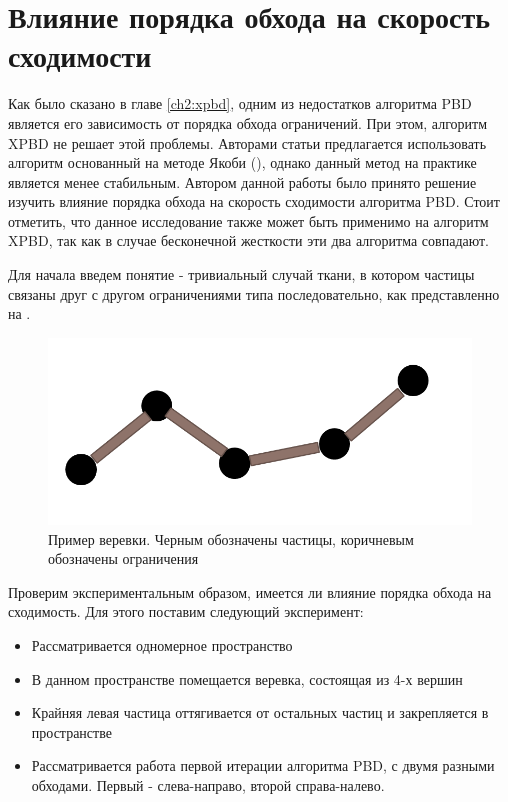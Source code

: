 \section{Влияние порядка обхода на скорость сходимости} \label{ch3:order}
	Как было сказано в главе \ref{ch2:xpbd}, одним из недостатков алгоритма PBD является его зависимость от порядка обхода ограничений. При этом, алгоритм XPBD не решает этой проблемы. Авторами статьи \cite{muller2020detailed} предлагается использовать алгоритм основанный на методе Якоби (), однако данный метод на практике является менее стабильным. Автором данной работы было принято решение изучить влияние порядка обхода на скорость сходимости алгоритма PBD. Стоит отметить, что данное исследование также может быть применимо на алгоритм XPBD, так как в случае бесконечной жесткости эти два алгоритма совпадают.
	
	Для начала введем понятие  - тривиальный случай ткани, в котором частицы связаны друг с другом ограничениями типа  последовательно, как представленно на .
	
	\begin{figure}[ht!] 
		\center
		\includegraphics [scale=0.3] {my_folder/images//rope}
		\caption{Пример веревки. Черным обозначены частицы, коричневым обозначены ограничения}
		\label{fig:rope}  
	\end{figure}
	
	Проверим экспериментальным образом, имеется ли влияние порядка обхода на сходимость. Для этого поставим следующий эксперимент:
	\begin{itemize}
		\item Рассматривается одномерное пространство
		\item В данном пространстве помещается веревка, состоящая из 4-х вершин
		\item Крайняя левая частица оттягивается от остальных частиц и закрепляется в пространстве
		\item Рассматривается работа первой итерации алгоритма PBD, с двумя разными обходами. Первый - слева-направо, второй справа-налево.
	\end{itemize}
	
